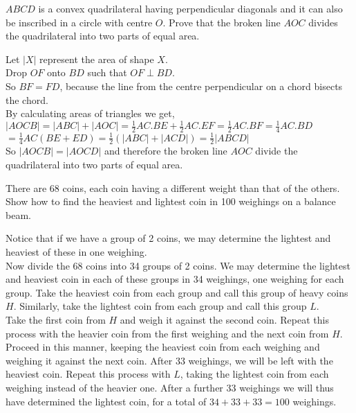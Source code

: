 \documentclass{article}
\begin{document}
\begin{enumerate}[1.]
\vspace{24pt}
{\itshape \item %
$ABCD$ is a convex quadrilateral having perpendicular diagonals and it can also be inscribed in a circle with centre $O$. Prove that the broken line $AOC$ divides the quadrilateral into two parts of equal area.}

Let $|X|$ represent the area of shape $X$.\\
Drop $OF$ onto $BD$ such that $OF \perp BD$.\\
So $BF = FD$, because the line from the centre perpendicular on a chord bisects the chord.\\
By calculating areas of triangles we get,\\
$|AOCB| = |ABC| + |AOC| = \frac{1}{2}AC.BE + \frac{1}{2}AC.EF = \frac{1}{2}AC.BF = \frac{1}{4}AC.BD$\\
$= \frac{1}{4}AC(BE+ED) = \frac{1}{2}(|ABC|+|ACD|) = \frac{1}{2}|ABCD|$\\
So $|AOCB| = |AOCD|$ and therefore the broken line $AOC$ divide the quadrilateral into two parts of equal area.

\vspace{24pt}
{\itshape \item %
There are 68 coins, each coin having a different weight than that of the others. Show how to find the heaviest and lightest coin in 100 weighings on a balance beam.}

Notice that if we have a group of 2 coins, we may determine the lightest and heaviest of these in one weighing.\\
\newline
Now divide the 68 coins into 34 groups of 2 coins. We may determine the lightest and heaviest coin in each of these groups in 34 weighings, one weighing for each group. Take the heaviest coin from each group and call this group of heavy coins $H$. Similarly, take the lightest coin from each group and call this group $L$.\\
\newline
Take the first coin from $H$ and weigh it against the second coin. Repeat this process with the heavier coin from the first weighing and the next coin from $H$. Proceed in this manner, keeping the heaviest coin from each weighing and weighing it against the next coin. After 33 weighings, we will be left with the heaviest coin. Repeat this process with $L$, taking the lightest coin from each weighing instead of the heavier one. After a further 33 weighings we will thus have determined the lightest coin, for a total of $34+33+33=100$ weighings.\\


\end{enumerate}
\end{document}
